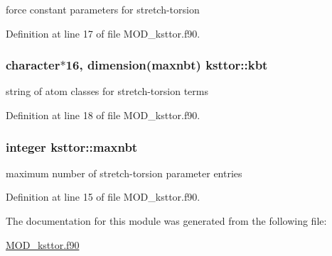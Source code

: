 force constant parameters for stretch-\/torsion 



Definition at line 17 of file M\-O\-D\-\_\-ksttor.\-f90.

\hypertarget{classksttor_a6efaad79cd35a8c6c8acce14669b81b1}{
\subsubsection[{kbt}]{\setlength{\rightskip}{0pt plus 5cm}character$\ast$16, dimension({\bf maxnbt}) ksttor\-::kbt}}\label{classksttor_a6efaad79cd35a8c6c8acce14669b81b1}


string of atom classes for stretch-\/torsion terms 



Definition at line 18 of file M\-O\-D\-\_\-ksttor.\-f90.

\hypertarget{classksttor_a14b6f7b59817819c6f1ab879e8aa4f53}{
\subsubsection[{maxnbt}]{\setlength{\rightskip}{0pt plus 5cm}integer ksttor\-::maxnbt}}\label{classksttor_a14b6f7b59817819c6f1ab879e8aa4f53}


maximum number of stretch-\/torsion parameter entries 



Definition at line 15 of file M\-O\-D\-\_\-ksttor.\-f90.



The documentation for this module was generated from the following file\-:\begin{DoxyCompactItemize}
\item 
\hyperlink{MOD__ksttor_8f90}{M\-O\-D\-\_\-ksttor.\-f90}\end{DoxyCompactItemize}

